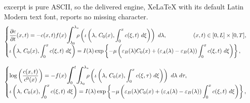 \documentclass[10pt,a4paper]{amsart}
\begin{document}
excerpt is pure ASCII, so the delivered engine, XeLaTeX with its default Latin Modern text font, reports no missing character.
\begin{equation}\label{eq:continuous_model}
    \begin{cases}
         \displaystyle\dfrac{\partial c}{\partial t}(x,t)=- c(x,t) f(x)\scalebox{1.3}{$\displaystyle\int$}_{\!\!\!\!\! \lambda_{0}}^{\lambda_{*}} \!\!\! \rho\left(\iota\left(\lambda,\, C_0(x), \int_0^x    c(\xi,t)  \ d\xi\right)\right) \ d\lambda, \qquad\qquad \ \ (x,t)\in [0,L]\times [0,T], \\
         \displaystyle \iota  \left(  \lambda,\, C_0(x),  \int_0^x   c(\xi,t) \ d\xi  \right)  =  I(\lambda) \exp  \left\{  -  \mu  \left(  \varepsilon_\texttt{B}(\lambda) C_0(x) +  (\varepsilon_\texttt{A}(\lambda) -\varepsilon_\texttt{B}(\lambda))  \int_0^x    c(\xi,t)  \ d\xi  \right)  \right\},
    \end{cases}
\end{equation}

\begin{equation}\label{eq:VFIE_model}
    \begin{cases}
         \displaystyle \log\left(\dfrac{c(x,t)}{c^0(x)}\right)=-f(x) \scalebox{1.3}{$\displaystyle\int$}_{\!\!\!\!\! 0}^{t}  \scalebox{1.3}{$\displaystyle\int$}_{\!\!\!\!\! \lambda_{0}}^{\lambda_{*}} \!\!\! \rho\left(\iota\left(\lambda,\, C_0(x), \int_0^x    c(\xi,\tau)  \ d\xi\right)\right) \ d\lambda \ d \tau,  \\
         \displaystyle \iota  \left(  \lambda,\, C_0(x),  \int_0^x   c(\xi,t) \ d\xi  \right)  =  I(\lambda) \exp  \left\{  -  \mu  \left(  \varepsilon_\texttt{B}(\lambda) C_0(x) +  (\varepsilon_\texttt{A}(\lambda) -\varepsilon_\texttt{B}(\lambda))  \int_0^x    c(\xi,t)  \ d\xi  \right)  \right\},
    \end{cases} 
\end{equation}
\end{document}
